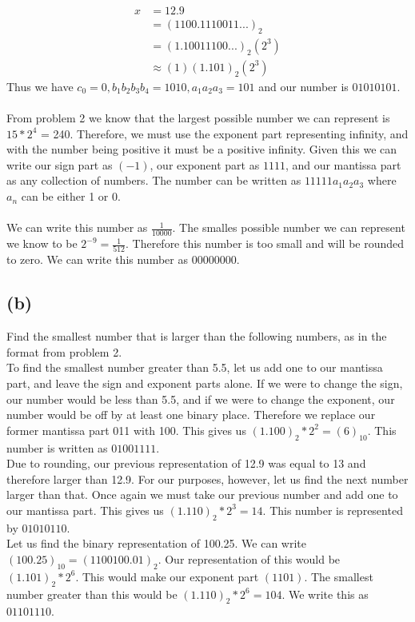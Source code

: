 \documentclass{article}
\begin{document}
			\begin{align*}
				x & = 12.9 \\
				& = (1100.1110011...)_2 \\
				& = (1.10011100...)_2(2^3) \\
				& \approx (1)(1.101)_2(2^3)
			\end{align*}
			Thus we have $c_0 = 0, b_1b_2b_3b_4 = 1010, a_1a_2a_3 = 101$ and our number is $01010101$. \\

		 \\
			From problem 2 we know that the largest possible number we can represent is $15 * 2^4$ = 240.
			Therefore, we must use the exponent part representing infinity, and with the number being positive it must be a positive infinity.
			Given this we can write our sign part as $(-1)$, our exponent part as $1111$, and our mantissa part as any collection of numbers. The number can be written as $11111a_1a_2a_3$ where $a_n$ can be either 1 or 0.\\

		 \\
			We can write this number as $\frac{1}{10000}$. The smalles possible number we can represent we know to be $2^{-9} = \frac{1}{512}$.
			Therefore this number is too small and will be rounded to zero. We can write this number as $00000000$.
		
	\subsection*{(b)}
		Find the smallest number that is larger than the following numbers, as in the format from problem 2.\\

			To find the smallest number greater than 5.5, let us add one to our mantissa part, and leave the sign and exponent parts alone.
			If we were to change the sign, our number would be less than 5.5, and if we were to change the exponent, our number would be off by at least one binary place.
			Therefore we replace our former mantissa part 011 with 100. This gives us $(1.100)_2 * 2^2 = (6)_{10}$.
			This number is written as $01001111$. \\

			Due to rounding, our previous representation of 12.9 was equal to 13 and therefore larger than 12.9.
			For our purposes, however, let us find the next number larger than that.
			Once again we must take our previous number and add one to our mantissa part. This gives us $(1.110)_2*2^3 = 14$.
			This number is represented by $01010110$. \\

			Let us find the binary representation of 100.25. We can write $(100.25)_{10} = (1100100.01)_2$.
			Our representation of this would be $(1.101)_2 * 2^6$. This would make our exponent part $(1101)$.
			The smallest number greater than this would be $(1.110)_2 * 2^6 = 104$.
			We write this as $01101110$.
\end{document}
